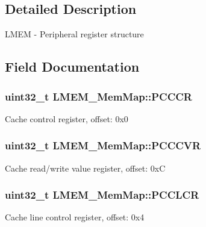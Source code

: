 \subsection{Detailed Description}
L\+M\+E\+M -\/ Peripheral register structure 

\subsection{Field Documentation}
\hypertarget{struct_l_m_e_m___mem_map_a6c1a7b2233d1c876439a885960f24960}{}
\subsubsection[{P\+C\+C\+C\+R}]{\setlength{\rightskip}{0pt plus 5cm}uint32\+\_\+t L\+M\+E\+M\+\_\+\+Mem\+Map\+::\+P\+C\+C\+C\+R}\label{struct_l_m_e_m___mem_map_a6c1a7b2233d1c876439a885960f24960}
Cache control register, offset\+: 0x0 \hypertarget{struct_l_m_e_m___mem_map_a0dd1ccb32a70f4e5463d84acebc78cf0}{}
\subsubsection[{P\+C\+C\+C\+V\+R}]{\setlength{\rightskip}{0pt plus 5cm}uint32\+\_\+t L\+M\+E\+M\+\_\+\+Mem\+Map\+::\+P\+C\+C\+C\+V\+R}\label{struct_l_m_e_m___mem_map_a0dd1ccb32a70f4e5463d84acebc78cf0}
Cache read/write value register, offset\+: 0x\+C \hypertarget{struct_l_m_e_m___mem_map_ad88f5f6b11fe26dbd6065a1767e6f4df}{}
\subsubsection[{P\+C\+C\+L\+C\+R}]{\setlength{\rightskip}{0pt plus 5cm}uint32\+\_\+t L\+M\+E\+M\+\_\+\+Mem\+Map\+::\+P\+C\+C\+L\+C\+R}\label{struct_l_m_e_m___mem_map_ad88f5f6b11fe26dbd6065a1767e6f4df}
Cache line control register, offset\+: 0x4 \hypertarget{struct_l_m_e_m___mem_map_afd9bb5dd96464953c7be37e55627192e}{}
